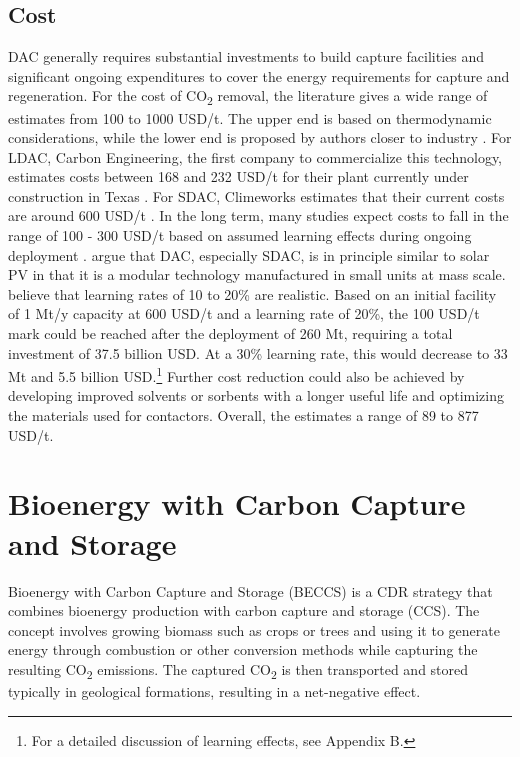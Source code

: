 \subsection*{Cost}
DAC generally requires substantial investments to build capture facilities and significant ongoing expenditures to cover the energy requirements for capture and regeneration.
For the cost of CO\textsubscript{2} removal, the literature gives a wide range of estimates from 100 to 1000 USD/t. The upper end is based on thermodynamic considerations, while the lower end is proposed by authors closer to industry \parencite{Ishimoto2017PuttingContext, NRC2015ClimateSequestration}.
For LDAC, Carbon Engineering, the first company to commercialize this technology, estimates costs between 168 and 232 USD/t for their plant currently under construction in Texas \parencite{McQueen2021AFuture}. For SDAC, Climeworks estimates that their current costs are around 600 USD/t \parencite[220]{NAS2018NegativeAgenda}.
In the long term, many studies expect costs to fall in the range of 100 - 300 USD/t based on assumed learning effects during ongoing deployment \parencite{Mulligan2020CarbonShot:States, McQueen2021AFuture, NAS2018NegativeAgenda}. \textcite{Lackner2021BuyingCapture} argue that DAC, especially SDAC, is in principle similar to solar PV in that it is a modular technology manufactured in small units at mass scale. \textcite{McQueen2021AFuture} believe that learning rates of 10 to 20\% are realistic. Based on an initial facility of 1 Mt/y capacity at 600 USD/t and a learning rate of 20\%, the 100 USD/t mark could be reached after the deployment of 260 Mt, requiring a total investment of 37.5 billion USD. At a 30\% learning rate, this would decrease to 33 Mt and 5.5 billion USD.\footnote{For a detailed discussion of learning effects, see Appendix B.}
Further cost reduction could also be achieved by developing improved solvents or sorbents with a longer useful life and optimizing the materials used for contactors.
Overall, the \textcite{NAS2018NegativeAgenda} estimates a range of 89 to 877 USD/t.

\section{Bioenergy with Carbon Capture and Storage}
Bioenergy with Carbon Capture and Storage (BECCS) is a CDR strategy that combines bioenergy production with carbon capture and storage (CCS). The concept involves growing biomass such as crops or trees and using it to generate energy through combustion or other conversion methods while capturing the resulting CO\textsubscript{2} emissions. The captured CO\textsubscript{2} is then transported and stored typically in geological formations, resulting in a net-negative effect.
